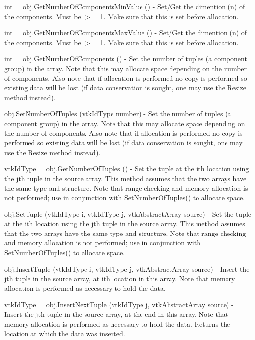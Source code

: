 \begin{DoxyItemize}
\item {\ttfamily int = obj.\-Get\-Number\-Of\-Components\-Min\-Value ()} -\/ Set/\-Get the dimention (n) of the components. Must be $>$= 1. Make sure that this is set before allocation.  
\item {\ttfamily int = obj.\-Get\-Number\-Of\-Components\-Max\-Value ()} -\/ Set/\-Get the dimention (n) of the components. Must be $>$= 1. Make sure that this is set before allocation.  
\item {\ttfamily int = obj.\-Get\-Number\-Of\-Components ()} -\/ Set the number of tuples (a component group) in the array. Note that this may allocate space depending on the number of components. Also note that if allocation is performed no copy is performed so existing data will be lost (if data conservation is sought, one may use the Resize method instead).  
\item {\ttfamily obj.\-Set\-Number\-Of\-Tuples (vtk\-Id\-Type number)} -\/ Set the number of tuples (a component group) in the array. Note that this may allocate space depending on the number of components. Also note that if allocation is performed no copy is performed so existing data will be lost (if data conservation is sought, one may use the Resize method instead).  
\item {\ttfamily vtk\-Id\-Type = obj.\-Get\-Number\-Of\-Tuples ()} -\/ Set the tuple at the ith location using the jth tuple in the source array. This method assumes that the two arrays have the same type and structure. Note that range checking and memory allocation is not performed; use in conjunction with Set\-Number\-Of\-Tuples() to allocate space.  
\item {\ttfamily obj.\-Set\-Tuple (vtk\-Id\-Type i, vtk\-Id\-Type j, vtk\-Abstract\-Array source)} -\/ Set the tuple at the ith location using the jth tuple in the source array. This method assumes that the two arrays have the same type and structure. Note that range checking and memory allocation is not performed; use in conjunction with Set\-Number\-Of\-Tuples() to allocate space.  
\item {\ttfamily obj.\-Insert\-Tuple (vtk\-Id\-Type i, vtk\-Id\-Type j, vtk\-Abstract\-Array source)} -\/ Insert the jth tuple in the source array, at ith location in this array. Note that memory allocation is performed as necessary to hold the data.  
\item {\ttfamily vtk\-Id\-Type = obj.\-Insert\-Next\-Tuple (vtk\-Id\-Type j, vtk\-Abstract\-Array source)} -\/ Insert the jth tuple in the source array, at the end in this array. Note that memory allocation is performed as necessary to hold the data. Returns the location at which the data was inserted.  

\end{DoxyItemize}

